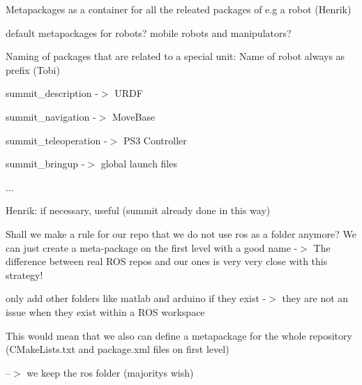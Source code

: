 \begin{DoxyEnumerate}
\item Metapackages as a container for all the releated packages of e.\+g a robot (Henrik)
\begin{DoxyEnumerate}
\item default metapackages for robots? mobile robots and manipulators?
\end{DoxyEnumerate}
\begin{DoxyEnumerate}
\item Naming of packages that are related to a special unit\+: Name of robot always as prefix (Tobi)
\begin{DoxyItemize}
\item summit\+\_\+description -\/$>$ U\+R\+DF
\item summit\+\_\+navigation -\/$>$ Move\+Base
\item summit\+\_\+teleoperation -\/$>$ P\+S3 Controller
\item summit\+\_\+bringup -\/$>$ global launch files
\item ...
\end{DoxyItemize}
\end{DoxyEnumerate}
\begin{DoxyEnumerate}
\item Henrik\+: if necessary, useful (summit already done in this way)
\end{DoxyEnumerate}
\end{DoxyEnumerate}
\begin{DoxyEnumerate}
\item Shall we make a rule for our repo that we do not use {\ttfamily ros} as a folder anymore? We can just create a meta-\/package on the first level with a good name -\/$>$ The difference between {\ttfamily real} R\+OS repos and our ones is very very close with this strategy!
\begin{DoxyEnumerate}
\item only add other folders like {\ttfamily matlab} and {\ttfamily arduino} if they exist -\/$>$ they are not an issue when they exist within a R\+OS workspace
\end{DoxyEnumerate}
\begin{DoxyEnumerate}
\item This would mean that we also can define a metapackage for the whole repository (C\+Make\+Lists.\+txt and package.\+xml files on first level)
\end{DoxyEnumerate}

--$>$ we keep the ros folder (majority\textquotesingle{}s wish)
\end{DoxyEnumerate}
